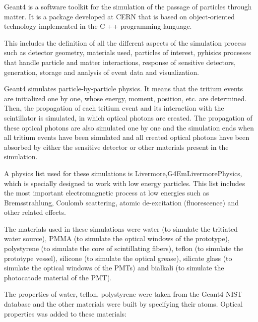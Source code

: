 Geant4 is a software toolkit for the simulation of the passage of particles through matter. It is a package developed at CERN that is based on object-oriented technology implemented in the C ++ programming language.

This includes the definition of all the different aspects of the simulation process such as detector geometry, materials used, particles of interest, pyhisics processes that handle particle and matter interactions, response of sensitive detectors, generation, storage and analysis of event data and visualization.

Geant4 simulates particle-by-particle physics. It means that the tritium events are initialized one by one, whose energy, moment, position, etc. are determined. Then, the propagation of each tritium event and its interaction  with the scintillator is simulated, in which optical photons are created. The propagation of these optical photons are also simulated one by one and the simulation ends when all tritium events have been simulated and all created optical photons have been absorbed by either the sensitive detector or other materials present in the simulation.

A physics list used for these simulations is Livermore,\newline G4EmLivermorePhysics, which is specially designed to work with low energy particles. This list includes the most important electromagnetic process at low energies such as Bremsstrahlung, Coulomb scattering, atomic de-excitation (fluorescence) and other related effects.

The materials used in these simulations were water (to simulate the tritiated water source), PMMA (to simulate the optical windows of the prototype), polystyrene (to simulate the core of scintillating fibers), teflon (to simulate the prototype vessel), silicone (to simulate the optical grease), silicate glass (to simulate the optical windows of the PMTs) and bialkali (to simulate the photocatode material of the PMT).

The properties of water, teflon, polystyrene were taken from the Geant4 NIST database and the other materials were built by specifying their atoms. Optical properties was added to these materials:

